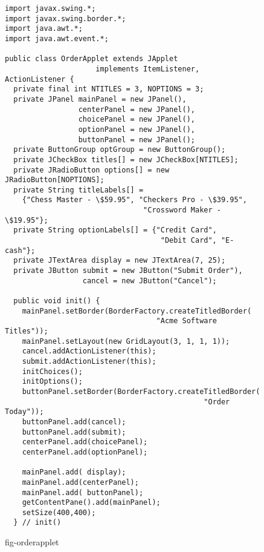 \begin{figure}[p]
\jjjprogstart
\begin{jjjlisting}[28pc]
\begin{lstlisting}
import javax.swing.*;
import javax.swing.border.*;
import java.awt.*;
import java.awt.event.*;

public class OrderApplet extends JApplet 
                     implements ItemListener, ActionListener {
  private final int NTITLES = 3, NOPTIONS = 3;
  private JPanel mainPanel = new JPanel(),
                 centerPanel = new JPanel(),
                 choicePanel = new JPanel(),
                 optionPanel = new JPanel(),
                 buttonPanel = new JPanel();
  private ButtonGroup optGroup = new ButtonGroup();
  private JCheckBox titles[] = new JCheckBox[NTITLES];
  private JRadioButton options[] = new JRadioButton[NOPTIONS];
  private String titleLabels[] =
    {"Chess Master - \$59.95", "Checkers Pro - \$39.95",
                                "Crossword Maker - \$19.95"};
  private String optionLabels[] = {"Credit Card", 
                                    "Debit Card", "E-cash"};
  private JTextArea display = new JTextArea(7, 25);
  private JButton submit = new JButton("Submit Order"),
                  cancel = new JButton("Cancel");

  public void init() {
    mainPanel.setBorder(BorderFactory.createTitledBorder(
                                   "Acme Software Titles"));
    mainPanel.setLayout(new GridLayout(3, 1, 1, 1));
    cancel.addActionListener(this);
    submit.addActionListener(this);
    initChoices();
    initOptions();
    buttonPanel.setBorder(BorderFactory.createTitledBorder(
                                              "Order Today"));
    buttonPanel.add(cancel);
    buttonPanel.add(submit);
    centerPanel.add(choicePanel);
    centerPanel.add(optionPanel);

    mainPanel.add( display);
    mainPanel.add(centerPanel);
    mainPanel.add( buttonPanel);
    getContentPane().add(mainPanel);
    setSize(400,400);
  } // init()
\end{lstlisting}
\end{jjjlisting}
{fig-orderapplet}
\end{figure}
